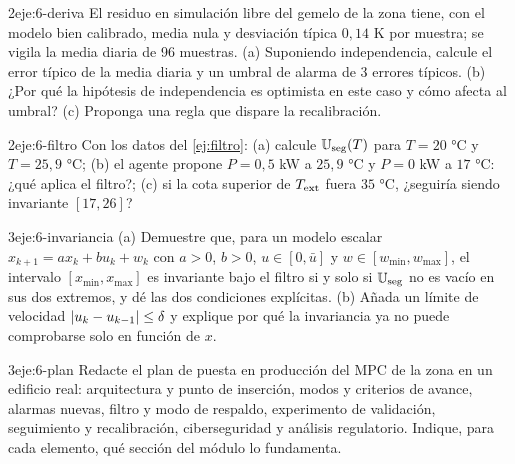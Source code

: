 \begin{ejercicio}{2}{eje:6-deriva}
El residuo en simulación libre del gemelo de la zona tiene, con el modelo bien calibrado, media nula y desviación típica $0{,}14$ K por muestra; se vigila la media diaria de 96 muestras. (a) Suponiendo independencia, calcule el error típico de la media diaria y un umbral de alarma de 3 errores típicos. (b) ¿Por qué la hipótesis de independencia es optimista en este caso y cómo afecta al umbral? (c) Proponga una regla que dispare la recalibración.
\end{ejercicio}

\begin{ejercicio}{2}{eje:6-filtro}
Con los datos del \cref{ej:filtro}: (a) calcule $\mathbb{U}_{\mathrm{seg}}(T)$ para $T=20$ °C y $T=25{,}9$ °C; (b) el agente propone $P=0{,}5$ kW a $25{,}9$ °C y $P=0$ kW a $17$ °C: ¿qué aplica el filtro?; (c) si la cota superior de $T_{\mathrm{ext}}$ fuera $35$ °C, ¿seguiría siendo invariante $[17,26]$?
\end{ejercicio}

\begin{ejercicio}{3}{eje:6-invariancia}
(a) Demuestre que, para un modelo escalar $x_{k+1}=ax_k+bu_k+w_k$ con $a>0$, $b>0$, $u\in[0,\bar u]$ y $w\in[w_{\min},w_{\max}]$, el intervalo $[x_{\min},x_{\max}]$ es invariante bajo el filtro si y solo si $\mathbb{U}_{\mathrm{seg}}$ no es vacío en sus dos extremos, y dé las dos condiciones explícitas. (b) Añada un límite de velocidad $\lvert u_k-u_{k-1}\rvert\le\delta$ y explique por qué la invariancia ya no puede comprobarse solo en función de $x$.
\end{ejercicio}

\begin{ejercicio}{3}{eje:6-plan}
Redacte el plan de puesta en producción del MPC de la zona en un edificio real: arquitectura y punto de inserción, modos y criterios de avance, alarmas nuevas, filtro y modo de respaldo, experimento de validación, seguimiento y recalibración, ciberseguridad y análisis regulatorio. Indique, para cada elemento, qué sección del módulo lo fundamenta.
\end{ejercicio}
